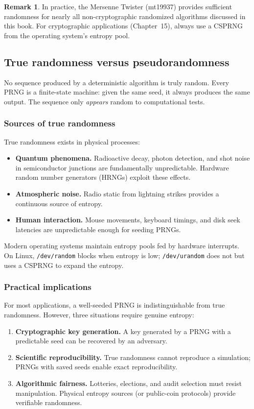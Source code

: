 \documentclass[twoside,12pt]{book}
\theoremstyle{plain}
\theoremstyle{definition}
\newtheorem{remark}[theorem]{Remark}
\theoremstyle{remark}
\begin{document}
\begin{remark}
In practice, the Mersenne Twister (mt19937) provides sufficient randomness
for nearly all non-cryptographic randomized algorithms discussed in this
book. For cryptographic applications (Chapter~15), always use a CSPRNG from
the operating system's entropy pool.
\end{remark}

\subsection{True randomness versus pseudorandomness}

No sequence produced by a deterministic algorithm is truly random. Every
PRNG is a finite-state machine: given the same seed, it always produces the
same output. The sequence only \emph{appears} random to computational tests.

\subsubsection{Sources of true randomness}

True randomness exists in physical processes:
\begin{itemize}
\item \textbf{Quantum phenomena.} Radioactive decay, photon detection, and
shot noise in semiconductor junctions are fundamentally unpredictable.
Hardware random number generators (HRNGs) exploit these effects.
\item \textbf{Atmospheric noise.} Radio static from lightning strikes
provides a continuous source of entropy.
\item \textbf{Human interaction.} Mouse movements, keyboard timings, and
disk seek latencies are unpredictable enough for seeding PRNGs.
\end{itemize}

Modern operating systems maintain entropy pools fed by hardware interrupts.
On Linux, \texttt{/dev/random} blocks when entropy is low;
\texttt{/dev/urandom} does not but uses a CSPRNG to expand the entropy.

\subsubsection{Practical implications}

For most applications, a well-seeded PRNG is indistinguishable from true
randomness. However, three situations require genuine entropy:
\begin{enumerate}
\item \textbf{Cryptographic key generation.} A key generated by a PRNG with
a predictable seed can be recovered by an adversary.
\item \textbf{Scientific reproducibility.} True randomness cannot reproduce
a simulation; PRNGs with saved seeds enable exact reproducibility.
\item \textbf{Algorithmic fairness.} Lotteries, elections, and audit
selection must resist manipulation. Physical entropy sources (or
public-coin protocols) provide verifiable randomness.
\end{enumerate}
\end{document}

